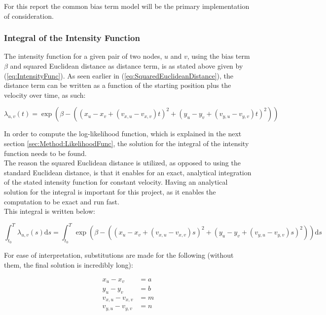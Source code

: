 For this report the common bias term model will be the primary implementation of consideration.

\subsubsection{Integral of the Intensity Function}
\label{sec:Method:IntensityFunc:IntegralIntensityFunc}

The intensity function for a given pair of two nodes, $u$ and $v$, using the bias term $\beta$ and squared Euclidean distance as distance term, is as stated above given by (\ref{eq:IntensityFunc}).
As seen earlier in (\ref{eq:SquaredEuclideanDistance}), the distance term can be written as a function of the starting position plus the velocity over time, as such:

\begin{equation}
    \lambda_{u,v}(t)
    =
    \exp \left(\beta - \left((x_u - x_v + (v_{x,u} - v_{x,v})t)^2 + (y_u - y_v + ( v_{y,u} - v_{y,v})t)^2\right)\right)
\end{equation}

In order to compute the log-likelihood function, which is explained in the next section \ref{sec:Method:LikelihoodFunc}, the solution for the integral of the intensity function needs to be found. 
\\
The reason the squared Euclidean distance is utilized, as opposed to using the standard Euclidean distance, is that it enables for an exact, analytical integration of the stated intensity function for constant velocity.
Having an analytical solution for the integral is important for this project, as it enables the computation to be exact and run fast.
\\
This integral is written below:

\begin{equation}
    \int_{t_0}^T \lambda_{u,v}(s) \mathrm{d}s 
    =
    \int_{t_0}^T \exp \left(\beta - \left((x_u - x_v + (v_{x,u} - v_{x,v})s)^2 + (y_u - y_v + ( v_{y,u} - v_{y,v})s)^2\right)\right) \mathrm{d}s
\end{equation}

For ease of interpretation, substitutions are made for the following (without them, the final solution is incredibly long):

\begin{align}
    x_u - x_v &= a
    \\
    y_u - y_v &= b
    \\
    v_{x,u} - v_{x,v} &= m
    \\
    v_{y,u} - v_{y,v} &= n
\end{align}

